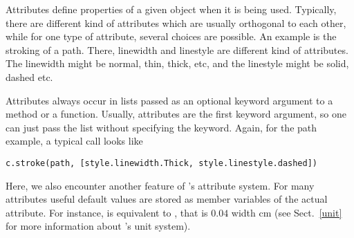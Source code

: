 \label{graphics:attributes}

Attributes define properties of a given object when it is being used.
Typically, there are different kind of attributes which are usually
orthogonal to each other, while for one type of attribute, several
choices are possible. An example is the stroking of a path. There,
linewidth and linestyle are different kind of attributes. The linewidth
might be normal, thin, thick, etc, and the linestyle might be solid,
dashed etc.

Attributes always occur in lists passed as an optional keyword argument
to a method or a function. Usually, attributes are the first keyword
argument, so one can just pass the list without specifying the keyword.
Again, for the path example, a typical call looks like

\begin{verbatim}
c.stroke(path, [style.linewidth.Thick, style.linestyle.dashed])
\end{verbatim}

Here, we also encounter another feature of \PyX's attribute system. For
many attributes useful default values are stored as member variables of
the actual attribute. For instance,  is
equivalent to , that is
$0.04$ width cm (see Sect.~\ref{unit} for more information about
\PyX's unit system). 


